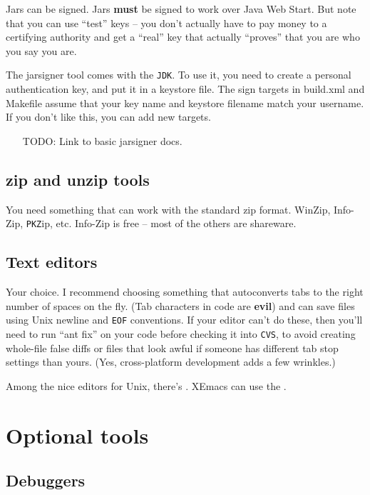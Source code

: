 \documentclass{article}
\begin{document}
Jars can be signed. Jars \textbf{must} be signed to work over Java Web Start.
But note that you can use ``test'' keys -- you don't actually have to
pay money to a certifying authority and get a ``real'' key that actually
``proves'' that you are who you say you are.

The jarsigner tool comes with the \texttt{JDK}. To use it, you need to create
a personal authentication key, and put it in a keystore file. The sign
targets in build.xml and Makefile assume that your key name and keystore
filename match your username. If you don't like this, you can add new
targets.

\begin{itemize}
\item[TODO:] Link to basic jarsigner docs.
\end{itemize}

\subsection{zip and unzip tools}

You need something that can work with the standard zip format. WinZip, 
Info-Zip, \texttt{PKZ}ip, etc. Info-Zip is free -- most of the others are
shareware. 

\subsection{Text editors}

Your choice. I recommend choosing something that autoconverts tabs to
the right number of spaces on the fly. (Tab characters in code are
\textbf{evil}) and can save files using Unix newline and \texttt{EOF}
conventions. If your editor can't do these, then you'll need to run
``ant fix'' on your code before checking it into \texttt{CVS}, to avoid
creating whole-file false diffs or files that look awful if someone has
different tab stop settings than yours. (Yes, cross-platform development
adds a few wrinkles.)

Among the nice editors for Unix, there's . XEmacs can use the .

\section{Optional tools}

\subsection{Debuggers}
\end{document}
